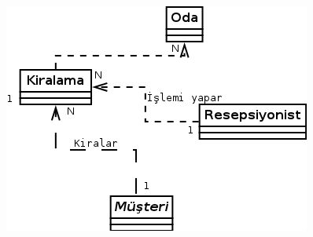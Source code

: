 \documentclass[12pt,a4paper]{report}
\begin{document}
\begin{center}
\includegraphics{dia/usecase2.png}
\end{center}
\end{document}
